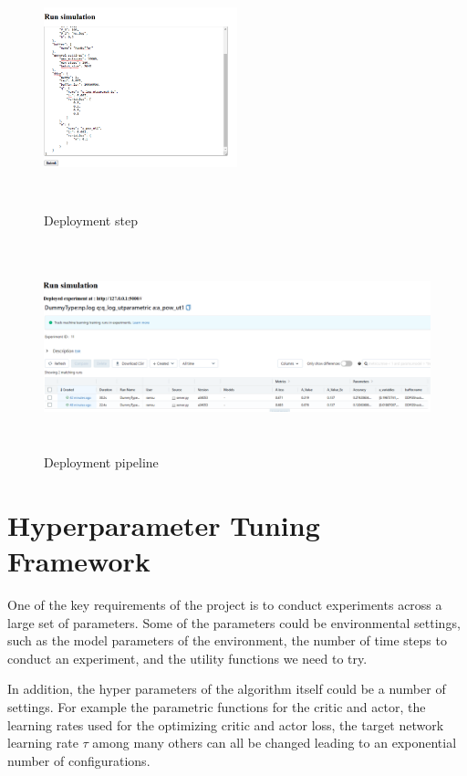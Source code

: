 \begin{figure}[htpb]
    \centering
    \includegraphics[width=0.5\textwidth,height=7cm]{figures/fastapi_deployment.png}
  \caption[Deployment step]{Deployment step } \label{fig:depl1}
\end{figure}
\begin{figure}[htpb]
    \includegraphics[width=1\textwidth,height=6cm]{figures/DeploymentResult.png}
  \caption[Deployment pipeline]{Deployment pipeline } \label{fig:depl2}
\end{figure}

\pagebreak

\section{Hyperparameter Tuning Framework} \label{section:hyp_parameter tuning framework}
One of the key requirements of the project is to conduct experiments across a large set of parameters. Some of the parameters could be environmental settings, such as the model parameters of the environment, the number of time steps to conduct an experiment, and the utility functions we need to try.

In addition, the hyper parameters of the algorithm itself could be a number of settings. For example  the parametric functions for the critic and actor, the learning rates used for the optimizing critic and actor loss, the target network learning rate $\tau$ among many others can all be changed leading to an exponential number of configurations. 

